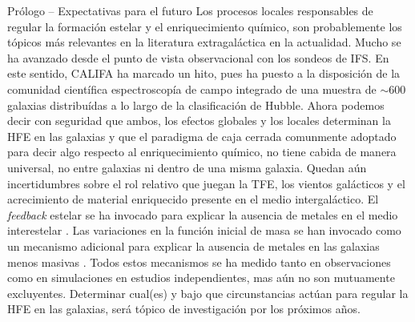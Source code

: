 \documentclass[xcolor=dvipsnames,4pt,hyperref={colorlinks,citecolor=black,linkcolor=black,urlcolor=black}]{beamer}
\begin{document}
\begin{frame}[allowframebreaks]{Prólogo -- Expectativas para el futuro}
%
Los procesos locales responsables de regular la formación estelar y el enriquecimiento químico, son
probablemente los tópicos más relevantes en la literatura extragaláctica en la actualidad. Mucho se
ha avanzado desde el punto de vista observacional con los sondeos de IFS. En este sentido, CALIFA ha
marcado un hito, pues ha puesto a la disposición de la comunidad científica espectroscopía de campo
integrado de una muestra de $\sim600$ galaxias distribuídas a lo largo de la clasificación de
Hubble. Ahora podemos decir con seguridad que ambos, los efectos globales y los locales determinan
la HFE en las galaxias y que el paradigma de caja cerrada comunmente adoptado para decir algo
respecto al enriquecimiento químico, no tiene cabida de manera universal, no entre galaxias ni
dentro de una misma galaxia. Quedan aún incertidumbres sobre el rol relativo que juegan la TFE, los
vientos galácticos y el acrecimiento de material enriquecido presente en el medio intergaláctico. El
\emph{feedback} estelar se ha invocado para explicar la ausencia de metales en el medio interestelar
\citep{Tremonti2004, Kobayashi2007}. Las variaciones en la función inicial de masa se han invocado
como un mecanismo adicional para explicar la ausencia de metales en las galaxias menos masivas
\citep{Koppen2007}. Todos estos mecanismos se ha medido tanto en observaciones como en simulaciones
en estudios independientes, mas aún no son mutuamente excluyentes. Determinar cual(es) y bajo que
circunstancias actúan para regular la HFE en las galaxias, será tópico de investigación por los
próximos años.
%
%
\end{frame}

\end{document}
